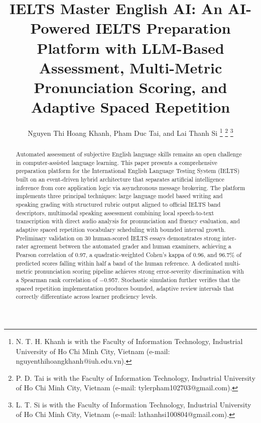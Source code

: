 \documentclass{IEEEtran}
\begin{document}
\title{IELTS Master English AI: An AI-Powered IELTS Preparation Platform with LLM-Based Assessment, Multi-Metric Pronunciation Scoring, and Adaptive Spaced Repetition}

\author{Nguyen Thi Hoang Khanh, Pham Duc Tai, and Lai Thanh Si
\thanks{N. T. H. Khanh is with the Faculty of Information Technology, Industrial University of Ho Chi Minh City, Vietnam (e-mail: nguyenthihoangkhanh@iuh.edu.vn).}
\thanks{P. D. Tai is with the Faculty of Information Technology, Industrial University of Ho Chi Minh City, Vietnam (e-mail: tylerpham102703@gmail.com).}
\thanks{L. T. Si is with the Faculty of Information Technology, Industrial University of Ho Chi Minh City, Vietnam (e-mail: lathanhsi100804@gmail.com).}}

\maketitle


\begin{abstract}
Automated assessment of subjective English language skills remains an open challenge in computer-assisted language learning. This paper presents a comprehensive preparation platform for the International English Language Testing System (IELTS) built on an event-driven hybrid architecture that separates artificial intelligence inference from core application logic via asynchronous message brokering. The platform implements three principal techniques: large language model based writing and speaking grading with structured rubric output aligned to official IELTS band descriptors, multimodal speaking assessment combining local speech-to-text transcription with direct audio analysis for pronunciation and fluency evaluation, and adaptive spaced repetition vocabulary scheduling with bounded interval growth. Preliminary validation on 30 human-scored IELTS essays demonstrates strong inter-rater agreement between the automated grader and human examiners, achieving a Pearson correlation of 0.97, a quadratic-weighted Cohen's kappa of 0.96, and 96.7\% of predicted scores falling within half a band of the human reference. A dedicated multi-metric pronunciation scoring pipeline achieves strong error-severity discrimination with a Spearman rank correlation of $-$0.957. Stochastic simulation further verifies that the spaced repetition implementation produces bounded, adaptive review intervals that correctly differentiate across learner proficiency levels.
\end{abstract}
\end{document}
